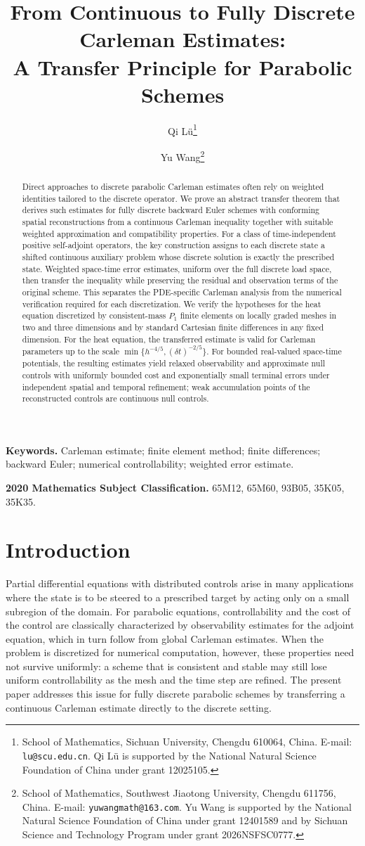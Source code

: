 \documentclass[print,wide,eng]{draft}
\title{\bf From Continuous to Fully Discrete Carleman Estimates:\\
A Transfer Principle for Parabolic Schemes}
\author{Qi L\"u\thanks{School of Mathematics, Sichuan University, Chengdu 610064, China. E-mail: \texttt{lu@scu.edu.cn}. Qi L\"u is supported by the National Natural Science Foundation of China under grant 12025105.}
\and
Yu Wang\thanks{School of Mathematics, Southwest Jiaotong University, Chengdu 611756, China. E-mail: \texttt{yuwangmath@163.com}. Yu Wang is supported by the National Natural Science Foundation of China under grant 12401589 and by Sichuan Science and Technology Program under grant 2026NSFSC0777.}}
\date{}
\begin{document}
\maketitle
\begin{abstract}
Direct approaches to discrete parabolic Carleman estimates often rely on weighted identities tailored to the discrete operator. We prove an abstract transfer theorem that derives such estimates for fully discrete backward Euler schemes with conforming spatial reconstructions from a continuous Carleman inequality together with suitable weighted approximation and compatibility properties. For a class of time-independent positive self-adjoint operators, the key construction assigns to each discrete state a shifted continuous auxiliary problem whose discrete solution is exactly the prescribed state. Weighted space-time error estimates, uniform over the full discrete load space, then transfer the inequality while preserving the residual and observation terms of the original scheme. This separates the PDE-specific Carleman analysis from the numerical verification required for each discretization. We verify the hypotheses for the heat equation discretized by consistent-mass $P_1$ finite elements on locally graded meshes in two and three dimensions and by standard Cartesian finite differences in any fixed dimension. For the heat equation, the transferred estimate is valid for Carleman parameters up to the scale $\min\{h^{-4/5},(\delta t)^{-2/5}\}$. For bounded real-valued space-time potentials, the resulting estimates yield relaxed observability and approximate null controls with uniformly bounded cost and exponentially small terminal errors under independent spatial and temporal refinement; weak accumulation points of the reconstructed controls are continuous null controls.
\end{abstract}

\noindent\textbf{Keywords.} Carleman estimate; finite element method; finite differences; backward Euler; numerical controllability; weighted error estimate.

\medskip
\noindent\textbf{2020 Mathematics Subject Classification.} 65M12, 65M60, 93B05, 35K05, 35K35.

\section{Introduction}\label{sec:intro}


Partial differential equations with distributed controls arise in many applications where the state is to be steered to a prescribed target by acting only on a small subregion of the domain. For parabolic equations, controllability and the cost of the control are classically characterized by observability estimates for the adjoint equation, which in turn follow from global Carleman estimates. When the problem is discretized for numerical computation, however, these properties need not survive uniformly: a scheme that is consistent and stable may still lose uniform controllability as the mesh and the time step are refined. The present paper addresses this issue for fully discrete parabolic schemes by transferring a continuous Carleman estimate directly to the discrete setting.
\end{document}
